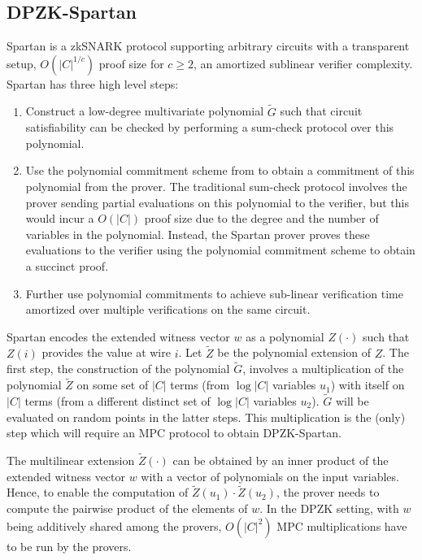 \subsection{DPZK-Spartan}
Spartan \cite{spartan} is a zkSNARK protocol supporting arbitrary circuits with a transparent setup, $O(|C|^{1/c})$ proof size for $c \geq 2$, an amortized sublinear verifier complexity. Spartan has three high level steps:
\begin{enumerate}
\item Construct a low-degree multivariate polynomial $\tilde{G}$ such that circuit satisfiability can be checked by performing a sum-check protocol \cite{sumcheck} over this polynomial.
\item Use the polynomial commitment scheme from \cite{hyrax} to obtain a commitment of this polynomial from the prover. The traditional sum-check protocol involves the prover sending partial evaluations on this polynomial to the verifier, but this would incur a $O(|C|)$ proof size due to the degree and the number of variables in the polynomial. Instead, the Spartan prover proves these evaluations to the verifier using the polynomial commitment scheme to obtain a succinct proof.
\item Further use polynomial commitments to achieve sub-linear verification time amortized over multiple verifications on the same circuit.
\end{enumerate}
Spartan encodes the extended witness vector $w$ as a polynomial $Z(\cdot)$ such that $Z(i)$ provides the value at wire $i$. Let $\tilde{Z}$ be the polynomial extension of $Z$.
The first step, the construction of the polynomial $\tilde{G}$, involves a multiplication of the polynomial $\tilde{Z}$ on some set of $|C|$ terms (from $\log |C|$ variables $u_1$) with itself on $|C|$ terms (from a different distinct set of $\log |C|$ variables $u_2$). $\tilde{G}$ will be evaluated on random points in the latter steps. This multiplication is the (only) step which will require an MPC protocol to obtain DPZK-Spartan. 

The multilinear extension $\tilde{Z}(\cdot)$ can be obtained by an inner product of the extended witness vector $w$ with a vector of polynomials on the input variables. Hence, to enable the computation of $\tilde{Z}(u_1) \cdot \tilde{Z}(u_2)$, the prover needs to compute the pairwise product of the elements of $w$. In the DPZK setting, with $w$ being additively shared among the provers, $O(|C|^2)$ MPC multiplications have to be run by the provers. 

